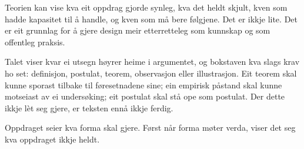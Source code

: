 \begin{widebody}
\begin{foreordbody}
Teorien kan vise kva eit oppdrag gjorde synleg, kva det heldt skjult, kven som hadde kapasitet til å handle, og kven som må bere følgjene. Det er ikkje lite. Det er eit grunnlag for å gjere design meir etterretteleg som kunnskap og som offentleg praksis.

Talet viser kvar ei utsegn høyrer heime i argumentet, og bokstaven kva slags krav ho set: definisjon, postulat, teorem, observasjon eller illustrasjon. Eit teorem skal kunne sporast tilbake til føresetnadene sine; ein empirisk påstand skal kunne motseiast av ei undersøking; eit postulat skal stå ope som postulat. Der dette ikkje lèt seg gjere, er teksten ennå ikkje ferdig.

Oppdraget seier kva forma skal gjere. Først når forma møter verda, viser det seg kva oppdraget ikkje heldt.

\end{foreordbody}
\end{widebody}
